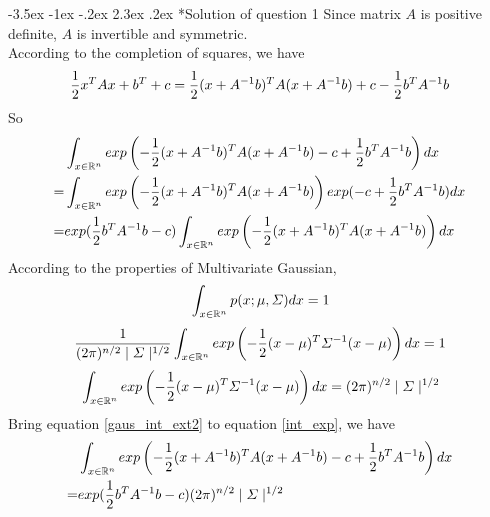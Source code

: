 \documentclass[12pt]{article}
\makeatletter
\renewcommand\section{\@startsection {section}{1}{\z@}%
	{-3.5ex \@plus -1ex \@minus -.2ex}%
	{2.3ex \@plus.2ex}%
	{\normalfont\large\bfseries}}%
\makeatother
\begin{document}
	\section*{Solution of question 1}
	Since matrix $A$ is positive definite, $A$ is invertible and symmetric.\\
	According to the completion of squares, we have
	\begin{equation}{\label{comp_square}}
		\frac{1}{2}x^TAx+b^T+c = \frac{1}{2}(x+A^{-1}b)^TA(x+A^{-1}b)+c-\frac{1}{2}b^TA^{-1}b
	\end{equation}
	So
	\begin{equation}{\label{int_exp}}
	\begin{split}
	\begin{aligned}
		&\int_{x\in\mathbb{R}^n}exp\left(-\frac{1}{2}(x+A^{-1}b)^TA(x+A^{-1}b)-c+\frac{1}{2}b^TA^{-1}b\right)dx\\
		=&\int_{x\in\mathbb{R}^n}exp\left(-\frac{1}{2}(x+A^{-1}b)^TA(x+A^{-1}b)\right)exp(-c+\frac{1}{2}b^TA^{-1}b)dx\\
		=&exp(\frac{1}{2}b^TA^{-1}b-c)\int_{x\in\mathbb{R}^n}exp\left(-\frac{1}{2}(x+A^{-1}b)^TA(x+A^{-1}b)\right)dx
	\end{aligned}
	\end{split}
	\end{equation}
	According to the properties of Multivariate Gaussian,
	\begin{equation}{\label{gaus_int}}
		\int_{x\in\mathbb{R}^n}p(x;\mu,\varSigma)dx = 1
	\end{equation}
	\begin{equation}{\label{gaus_int_ext1}}
		\frac{1}{(2\pi)^{n/2}\mid\varSigma\mid^{1/2}}\int_{x\in\mathbb{R}^n}exp\left(-\frac{1}{2}(x-\mu)^T\varSigma^{-1}(x-\mu)\right)dx = 1
	\end{equation}
	\begin{equation}{\label{gaus_int_ext2}}
		\int_{x\in\mathbb{R}^n}exp\left(-\frac{1}{2}(x-\mu)^T\varSigma^{-1}(x-\mu)\right)dx = (2\pi)^{n/2}\mid\varSigma\mid^{1/2}
	\end{equation}
	\noindent
	Bring equation \ref{gaus_int_ext2} to equation \ref{int_exp}, we have
	\begin{equation}{\label{gaus_int_ext3}}
	\begin{aligned}
		&\int_{x\in\mathbb{R}^n}exp\left(-\frac{1}{2}(x+A^{-1}b)^TA(x+A^{-1}b)-c+\frac{1}{2}b^TA^{-1}b\right)dx\\
		=&exp(\frac{1}{2}b^TA^{-1}b-c)(2\pi)^{n/2}\mid\varSigma\mid^{1/2}
	\end{aligned}
	\end{equation}
	
\end{document}
